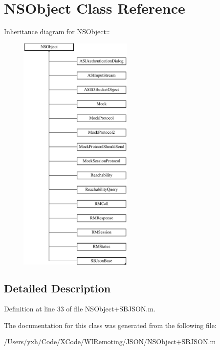 \hypertarget{class_n_s_object}{
\section{NSObject Class Reference}
\label{class_n_s_object}
}
Inheritance diagram for NSObject::\begin{figure}[H]
\begin{center}
\leavevmode
\includegraphics[height=12cm]{class_n_s_object}
\end{center}
\end{figure}


\subsection{Detailed Description}


Definition at line 33 of file NSObject+SBJSON.m.

The documentation for this class was generated from the following file:\begin{DoxyCompactItemize}
\item 
/Users/yxh/Code/XCode/WIRemoting/JSON/NSObject+SBJSON.m\end{DoxyCompactItemize}
